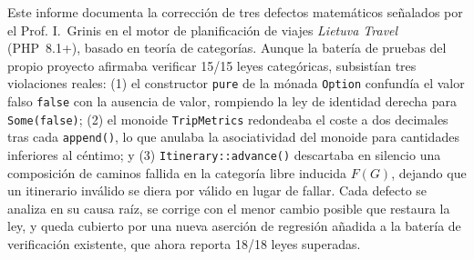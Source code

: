 Este informe documenta la corrección de tres defectos matemáticos señalados por el Prof. I.~Grinis en el motor de planificación de viajes \emph{Lietuva Travel} (PHP~8.1+), basado en teoría de categorías. Aunque la batería de pruebas del propio proyecto afirmaba verificar 15/15 leyes categóricas, subsistían tres violaciones reales: (1) el constructor \texttt{pure} de la mónada \texttt{Option} confundía el valor falso \texttt{false} con la ausencia de valor, rompiendo la ley de identidad derecha para \texttt{Some(false)}; (2) el monoide \texttt{TripMetrics} redondeaba el coste a dos decimales tras cada \texttt{append()}, lo que anulaba la asociatividad del monoide para cantidades inferiores al céntimo; y (3) \texttt{Itinerary::advance()} descartaba en silencio una composición de caminos fallida en la categoría libre inducida $F(G)$, dejando que un itinerario inválido se diera por válido en lugar de fallar. Cada defecto se analiza en su causa raíz, se corrige con el menor cambio posible que restaura la ley, y queda cubierto por una nueva aserción de regresión añadida a la batería de verificación existente, que ahora reporta 18/18 leyes superadas.
